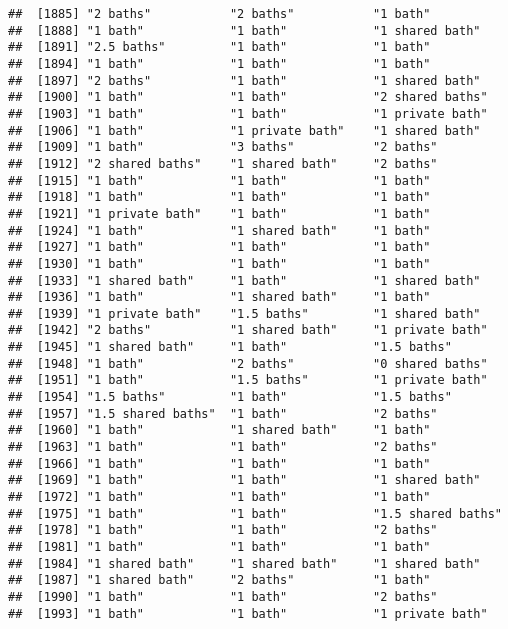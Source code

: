 \documentclass[
]{article}
\begin{document}
\begin{verbatim}
##  [1885] "2 baths"           "2 baths"           "1 bath"           
##  [1888] "1 bath"            "1 bath"            "1 shared bath"    
##  [1891] "2.5 baths"         "1 bath"            "1 bath"           
##  [1894] "1 bath"            "1 bath"            "1 bath"           
##  [1897] "2 baths"           "1 bath"            "1 shared bath"    
##  [1900] "1 bath"            "1 bath"            "2 shared baths"   
##  [1903] "1 bath"            "1 bath"            "1 private bath"   
##  [1906] "1 bath"            "1 private bath"    "1 shared bath"    
##  [1909] "1 bath"            "3 baths"           "2 baths"          
##  [1912] "2 shared baths"    "1 shared bath"     "2 baths"          
##  [1915] "1 bath"            "1 bath"            "1 bath"           
##  [1918] "1 bath"            "1 bath"            "1 bath"           
##  [1921] "1 private bath"    "1 bath"            "1 bath"           
##  [1924] "1 bath"            "1 shared bath"     "1 bath"           
##  [1927] "1 bath"            "1 bath"            "1 bath"           
##  [1930] "1 bath"            "1 bath"            "1 bath"           
##  [1933] "1 shared bath"     "1 bath"            "1 shared bath"    
##  [1936] "1 bath"            "1 shared bath"     "1 bath"           
##  [1939] "1 private bath"    "1.5 baths"         "1 shared bath"    
##  [1942] "2 baths"           "1 shared bath"     "1 private bath"   
##  [1945] "1 shared bath"     "1 bath"            "1.5 baths"        
##  [1948] "1 bath"            "2 baths"           "0 shared baths"   
##  [1951] "1 bath"            "1.5 baths"         "1 private bath"   
##  [1954] "1.5 baths"         "1 bath"            "1.5 baths"        
##  [1957] "1.5 shared baths"  "1 bath"            "2 baths"          
##  [1960] "1 bath"            "1 shared bath"     "1 bath"           
##  [1963] "1 bath"            "1 bath"            "2 baths"          
##  [1966] "1 bath"            "1 bath"            "1 bath"           
##  [1969] "1 bath"            "1 bath"            "1 shared bath"    
##  [1972] "1 bath"            "1 bath"            "1 bath"           
##  [1975] "1 bath"            "1 bath"            "1.5 shared baths" 
##  [1978] "1 bath"            "1 bath"            "2 baths"          
##  [1981] "1 bath"            "1 bath"            "1 bath"           
##  [1984] "1 shared bath"     "1 shared bath"     "1 shared bath"    
##  [1987] "1 shared bath"     "2 baths"           "1 bath"           
##  [1990] "1 bath"            "1 bath"            "2 baths"          
##  [1993] "1 bath"            "1 bath"            "1 private bath"   

\end{verbatim}
\end{document}
